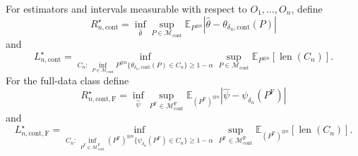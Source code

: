For estimators and intervals measurable with respect to \(O_1,\ldots,O_n\), define
\[
 R_{n,\mathrm{cont}}^\star
 =\inf_{\widehat\theta}\sup_{P\in\mathcal M_{\mathrm{cont}}}
 \mathbb E_{P^{\otimes n}}|\widehat\theta-\theta_{\delta_n,\mathrm{cont}}(P)|
\]
and
\[
 L_{n,\mathrm{cont}}^\star
 =\inf_{C_n:\,\inf_{P\in\mathcal M_{\mathrm{cont}}}P^{\otimes n}
 \{\theta_{\delta_n,\mathrm{cont}}(P)\in C_n\}\geq1-\alpha}
 \sup_{P\in\mathcal M_{\mathrm{cont}}}
 \mathbb E_{P^{\otimes n}}[\operatorname{len}(C_n)].
\]
For the full-data class define
\[
 R_{n,\mathrm{cont},\mathrm F}^\star
 =\inf_{\widehat\psi}\sup_{P^{\mathrm F}\in\mathcal M_{\mathrm{cont}}^{\mathrm F}}
 \mathbb E_{(P^{\mathrm F})^{\otimes n}}|\widehat\psi-\psi_{\delta_n}(P^{\mathrm F})|
\]
and
\[
 L_{n,\mathrm{cont},\mathrm F}^\star
 =\inf_{C_n:\,\inf_{P^{\mathrm F}\in\mathcal M_{\mathrm{cont}}^{\mathrm F}}
 (P^{\mathrm F})^{\otimes n}\{\psi_{\delta_n}(P^{\mathrm F})\in C_n\}\geq1-\alpha}
 \sup_{P^{\mathrm F}\in\mathcal M_{\mathrm{cont}}^{\mathrm F}}
 \mathbb E_{(P^{\mathrm F})^{\otimes n}}[\operatorname{len}(C_n)].
\]
